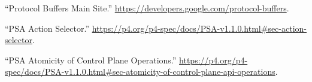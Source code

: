 \documentclass[11pt]{article}
\begin{document}
{{\begin{thebibliography}{39}
\mdbibitemlabel{{}[21]}\textquotedblleft{}Protocol Buffers Main Site.\textquotedblright{} \href{https://developers.google.com/protocol-buffers}{{\ttfamily https://\hspace{0pt}developers.\hspace{0pt}google.\hspace{0pt}com/\hspace{0pt}protocol-\hspace{0pt}buffers}}.\label{proto}%

\mdbibitemlabel{{}[22]}\textquotedblleft{}PSA Action Selector.\textquotedblright{} \href{https://p4.org/p4-spec/docs/PSA-v1.1.0.html\%23sec-action-selector}{{\ttfamily https://\hspace{0pt}p4.\hspace{0pt}org/\hspace{0pt}p4-\hspace{0pt}spec/\hspace{0pt}docs/\hspace{0pt}PSA-\hspace{0pt}v1.\hspace{0pt}1.\hspace{0pt}0.\hspace{0pt}html\#\hspace{0pt}sec-\hspace{0pt}action-\hspace{0pt}selector}}.\label{psaactionselector}%

\mdbibitemlabel{{}[23]}\textquotedblleft{}PSA Atomicity of Control Plane Operations.\textquotedblright{} \href{https://p4.org/p4-spec/docs/PSA-v1.1.0.html\%23sec-atomicity-of-control-plane-api-operations}{{\ttfamily https://\hspace{0pt}p4.\hspace{0pt}org/\hspace{0pt}p4-\hspace{0pt}spec/\hspace{0pt}docs/\hspace{0pt}PSA-\hspace{0pt}v1.\hspace{0pt}1.\hspace{0pt}0.\hspace{0pt}html\#\hspace{0pt}sec-\hspace{0pt}atomicity-\hspace{0pt}of-\hspace{0pt}control-\hspace{0pt}plane-\hspace{0pt}api-\hspace{0pt}operations}}.\label{psaatomicityofcontrolplaneops}%


\end{thebibliography}}}
\end{document}
